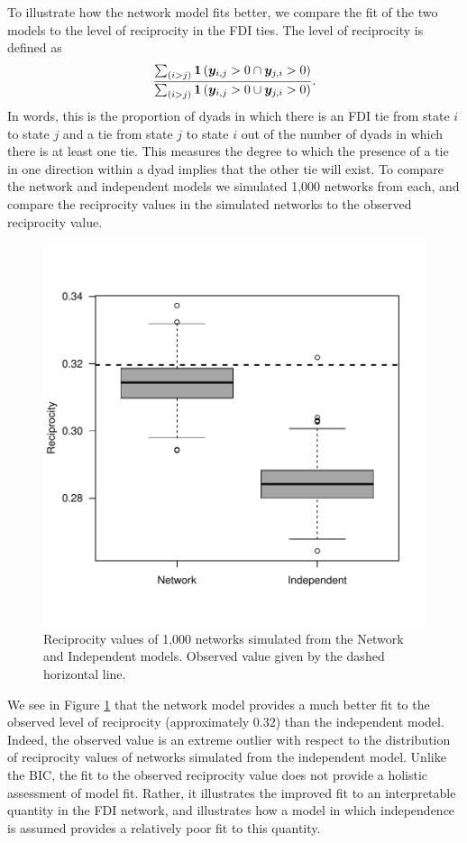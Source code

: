 \documentclass[reqno,onecolumn,letterpaper,12pt]{article}
\begin{document}
To illustrate how the network model fits better, we compare the fit of the two models to the level of reciprocity in the FDI ties. The level of reciprocity is defined as $$ \frac{ \sum_{(i>j)} \text{\bf 1}\left( \bm{y}_{i,j}>0  \cap \bm{y}_{j,i}>0 \right)}{ \sum_{(i>j)} \text{\bf 1}\left( \bm{y}_{i,j}>0  \cup \bm{y}_{j,i}>0 \right)}.$$ In words, this is the proportion of dyads in which there is an FDI tie from state $i$ to state $j$ and a tie from state $j$ to state $i$ out of the number of dyads in which there is at least one tie. This measures the degree to which the presence of a tie in one direction within a dyad implies that the other tie will exist. To compare the network and independent models we simulated 1,000 networks from each, and compare the reciprocity values in the simulated networks to the observed reciprocity value.
\begin{figure}[!h]
\centering
\includegraphics[scale=.75]{draft_figures/reciprocityFit.pdf} \vspace{-.5cm}
\caption{\label{fig:recipFit} Reciprocity values of 1,000 networks simulated from the Network and Independent models. Observed value given by the dashed horizontal line.}
\end{figure}
We see in Figure \ref{fig:recipFit} that the network model provides a much better fit to the observed level of reciprocity (approximately 0.32) than the independent model. Indeed, the observed value is an extreme outlier with respect to the distribution of reciprocity values of networks simulated from the independent model. Unlike the BIC, the fit to the observed reciprocity value does not provide a holistic assessment of model fit. Rather, it illustrates the improved fit to an interpretable quantity in the FDI network, and illustrates how a model in which independence is assumed provides a relatively poor fit to this quantity.
\end{document}

